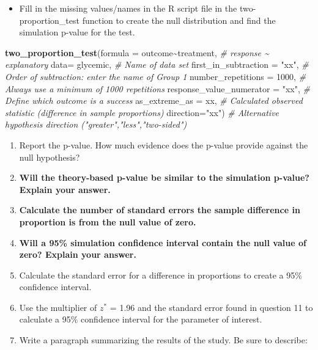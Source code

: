 \documentclass[
]{report}
\newenvironment{Shaded}{\begin{snugshade}}{\end{snugshade}}
\newcommand{\AttributeTok}[1]{\textcolor[rgb]{0.13,0.29,0.53}{#1}}
\newcommand{\CommentTok}[1]{\textcolor[rgb]{0.56,0.35,0.01}{\textit{#1}}}
\newcommand{\DecValTok}[1]{\textcolor[rgb]{0.00,0.00,0.81}{#1}}
\newcommand{\FunctionTok}[1]{\textcolor[rgb]{0.13,0.29,0.53}{\textbf{#1}}}
\newcommand{\NormalTok}[1]{#1}
\newcommand{\SpecialCharTok}[1]{\textcolor[rgb]{0.81,0.36,0.00}{\textbf{#1}}}
\newcommand{\StringTok}[1]{\textcolor[rgb]{0.31,0.60,0.02}{#1}}
\providecommand{\tightlist}{%
  \setlength{\itemsep}{0pt}\setlength{\parskip}{0pt}}
\begin{document}
\begin{itemize}
\tightlist
\item
  Fill in the missing values/names in the R script file in the two-proportion\_test function to create the null distribution and find the simulation p-value for the test.
\end{itemize}

\begin{Shaded}
\begin{Highlighting}[]
\FunctionTok{two\_proportion\_test}\NormalTok{(}\AttributeTok{formula =}\NormalTok{ outcome}\SpecialCharTok{\textasciitilde{}}\NormalTok{treatment, }\CommentTok{\# response \textasciitilde{} explanatory}
         \AttributeTok{data=}\NormalTok{ glycemic, }\CommentTok{\# Name of data set}
         \AttributeTok{first\_in\_subtraction =} \StringTok{"xx"}\NormalTok{, }\CommentTok{\# Order of subtraction: enter the name of Group 1}
         \AttributeTok{number\_repetitions =} \DecValTok{1000}\NormalTok{, }\CommentTok{\# Always use a minimum of 1000 repetitions}
         \AttributeTok{response\_value\_numerator =} \StringTok{"xx"}\NormalTok{, }\CommentTok{\# Define which outcome is a success }
         \AttributeTok{as\_extreme\_as =}\NormalTok{ xx, }\CommentTok{\# Calculated observed statistic (difference in sample proportions)}
         \AttributeTok{direction=}\StringTok{"xx"}\NormalTok{) }\CommentTok{\# Alternative hypothesis direction ("greater","less","two{-}sided")}
\end{Highlighting}
\end{Shaded}

\begin{enumerate}
\def\labelenumi{\arabic{enumi}.}
\setcounter{enumi}{6}
\item
  Report the p-value. How much evidence does the p-value provide against the null hypothesis?
  \vspace{0.3in}
\item
  \textbf{Will the theory-based p-value be similar to the simulation p-value? Explain your answer.}
  \vspace{0.7in}
\item
  \textbf{Calculate the number of standard errors the sample difference in proportion is from the null value of zero.}
  \vspace{0.7in}
\item
  \textbf{Will a 95\% simulation confidence interval contain the null value of zero? Explain your answer.}
  \vspace{0.7in}
\item
  Calculate the standard error for a difference in proportions to create a 95\% confidence interval.\\
  \vspace{0.8in}
\item
  Use the multiplier of \(z^*\) = 1.96 and the standard error found in question 11 to calculate a 95\% confidence interval for the parameter of interest.
  \vspace{1in}
\item
  Write a paragraph summarizing the results of the study. Be sure to describe:
\end{enumerate}
\end{document}
